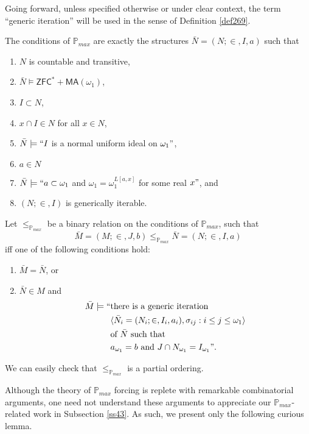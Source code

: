 \documentclass[12pt]{article}
\numberwithin{equation}{section}
\begin{document}
Going forward, unless specified otherwise or under clear context, the term ``generic iteration'' will be used in the sense of Definition \ref{def269}.

\begin{defi}\label{pmax}
The conditions of $\mathbb{P}_{max}$ are exactly the structures $\bar{N} = (N; \in, I, a)$ such that
\begin{enumerate}[label=(\alph*)]
    \item $N$ is countable and transitive,
    \item $\bar{N} \models \mathsf{ZFC}^* + \mathsf{MA}(\omega_1)$,
    \item $I \subset N$,
    \item $x \cap I \in N$ for all $x \in N$,
    \item $\bar{N} \models ``I$ is a normal uniform ideal on $\omega_1"$, 
    \item $a \in N$
    \item $\bar{N} \models ``a \subset \omega_1$ and $\omega_1 = \omega_1^{L[a, x]}$ for some real $x"$, and
    \item $(N; \in, I)$ is generically iterable.
\end{enumerate}
Let $\leq_{\mathbb{P}_{max}}$ be a binary relation on the conditions of $\mathbb{P}_{max}$, such that $$\bar{M} = (M; \in, J, b) \leq_{\mathbb{P}_{max}} \bar{N} = (N; \in, I, a)$$ iff one of the following conditions hold:
\begin{enumerate}[label=(\roman*)]
    \item $\bar{M} = \bar{N}$, or 
    \item $\bar{N} \in M$ and
    \begin{align*}
        \bar{M} \models `` & \text{there is a generic iteration } \\ 
        & \langle \bar{N}_i = (N_i; \in, I_i, a_i), \sigma_{ij} : i \leq j \leq \omega_1 \rangle \\
        & \text{of } \bar{N} \text{ such that} \\
        & a_{\omega_1} = b \text{ and } J \cap N_{\omega_1} = I_{\omega_1}".
    \end{align*}
\end{enumerate}
We can easily check that $\leq_{\mathbb{P}_{max}}$ is a partial ordering.
\end{defi}

Although the theory of $\mathbb{P}_{max}$ forcing is replete with remarkable combinatorial arguments, one need not understand these arguments to appreciate our $\mathbb{P}_{max}$-related work in Subsection \ref{ss43}. As such, we present only the following curious lemma.
\end{document}
